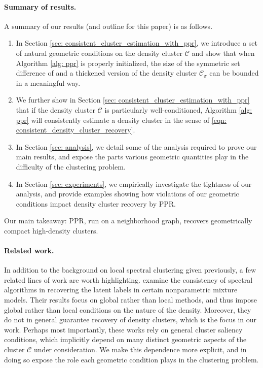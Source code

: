 \documentclass{article}
\newcommand{\1}{\mathbf{1}}
\newcommand{\Cset}{\mathcal{C}}
\newcommand{\Csig}{\Cset_{\sigma}}
\newcommand{\Cest}{\widehat{C}}
\theoremstyle{aldenthm}
\theoremstyle{aldenrmrk}
\begin{document}
\paragraph{Summary of results.} A summary of our results (and outline for this
paper) is as follows.

\begin{enumerate}
\item In Section \ref{sec: consistent_cluster_estimation_with_ppr}, we introduce
  a set of natural geometric conditions on the density cluster $\Cset$
  and show that when Algorithm \ref{alg: ppr} is properly initialized, the size of
  the symmetric set difference of \smash{$\Cest$} and a thickened version of the
  density cluster $\Csig$ can be bounded in a meaningful way.
	
\item We further show in Section \ref{sec:
    consistent_cluster_estimation_with_ppr} that if the density cluster 
  $\Cset$ is particularly well-conditioned, Algorithm \ref{alg: ppr}
  will consistently estimate a density cluster in the sense of
  \eqref{eqn: consistent_density_cluster_recovery}. 
	
\item In Section \ref{sec: analysis}, we detail some of the analysis required to
  prove our main results, and expose the parts various geometric quantities play 
  in the difficulty of the clustering problem. 
	
\item In Section \ref{sec: experiments}, we empirically investigate the
  tightness of our analysis, and provide examples showing how violations of our
  geometric conditions impact density cluster recovery by PPR.
\end{enumerate}

Our main takeaway: PPR, run on a neighborhood graph, recovers geometrically
compact high-density clusters. 

\paragraph{Related work.} In addition to the background on local spectral
clustering given previously, a few related lines of work are worth
highlighting. \citep{shi2009,schiebinger2015} examine the consistency of  
spectral algorithms in recovering the latent labels in certain
nonparametric mixture models. Their results focus on global rather than local 
methods, and thus impose global rather than local conditions on the nature
of the density. Moreover, they do not in general guarantee recovery of density 
clusters, which is the focus in our work. Perhaps most importantly, these works
rely on general cluster saliency conditions, which implicitly depend on many
distinct geometric aspects of the cluster $\Cset$ under consideration. We make
this dependence more explicit, and in doing so expose the role each geometric
condition plays in the clustering problem. 
\end{document}
